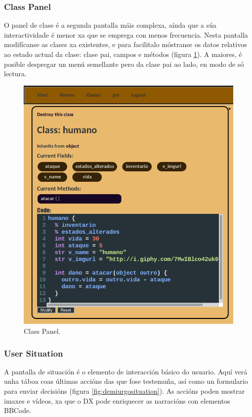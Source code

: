 \subsubsection{Class Panel}
O panel de clase é a segunda pantalla máis complexa, aínda que a súa
interactividade é menor xa que se emprega con menos frecuencia. Nesta pantalla
modifícanse as clases xa existentes, e para facilitalo móstranse os datos
relativos ao estado actual da clase: clase pai, campos e métodos (figura
\ref{fig:demiurgoclasspanel}). A maiores, é posible despregar un menú semellante
pero da clase pai ao lado, en modo de só lectura.

\begin{figure}
\centerline{\includegraphics{figuras/demiurgo_classpanel.png}}
\caption{Class Panel.}
\label{fig:demiurgoclasspanel}
\end{figure}

\subsubsection{User Situation}
A pantalla de situación é o elemento de interacción básico do usuario. Aquí verá
unha táboa coas últimas accións das que fose testemuña, así como un formulario
para enviar decisións (figura \ref{fig:demiurgosituation}). As accións
poden mostrar imaxes e vídeos, xa que o DX pode enriquecer as narracións con
elementos BBCode.

